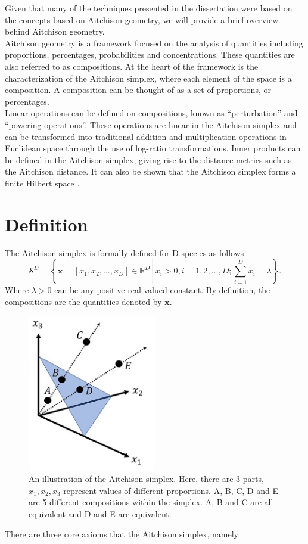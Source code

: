 Given that many of the techniques presented in the dissertation were based on the concepts based on Aitchison geometry, we will provide a brief overview behind Aitchison geometry.\\[5 mm]
%
Aitchison geometry is a framework focused on the analysis of quantities including proportions, percentages, probabilities and concentrations.  These quantities are also referred to as compositions.  At the heart of the framework is the characterization of the Aitchison simplex, where each element of the space is a composition.  A composition can be thought of as a set of proportions, or percentages.\\[5 mm]
%
Linear operations can be defined on compositions, known as ``perturbation'' and ``powering operations''.  These operations are linear in the Aitchison simplex and can be transformed into traditional addition and multiplication operations in Euclidean space through the use of log-ratio transformations.  Inner products can be defined in the Aitchison simplex, giving rise to the distance metrics such as the Aitchison distance.  It can also be shown that the Aitchison simplex forms a finite Hilbert space \cite{Pawlowsky-Glahn2015-qb}. \\[5 mm]
%
\section{Definition}
The Aitchison simplex is formally defined for D species as follows
\[\mathcal{S}^D=\left\{\mathbf{x}=[x_1,x_2,\dots,x_D]\in\mathbb{R}^D \,\left|\, x_i>0,i=1,2,\dots,D; \sum_{i=1}^D x_i=\lambda \right. \right\}. \]
Where $\lambda>0$ can be any positive real-valued constant.  By definition, the compositions are the quantities denoted by $\mathbf{x}$.

 \begin{figure}[H]
         \centering
         \includegraphics[width=0.5\textwidth]{appendix_c/Aitchison-simplex.jpg}
         \caption[An illustration of the Aitchison simplex.]
                 {An illustration of the Aitchison simplex.  Here, there are 3 parts, $x_1, x_2,  x_3$ represent values of different proportions.  A, B, C, D and E are 5 different compositions within the simplex.  A, B and C are all equivalent and D and E are equivalent.}
         \label{figcS1}
 \end{figure}
There are three core axioms that the Aitchison simplex, namely

